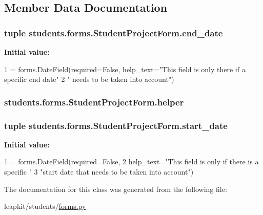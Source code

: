 \subsection{Member Data Documentation}
\hypertarget{classstudents_1_1forms_1_1_student_project_form_a14f811fbf8eae30cb9d0b2fd12adcf6b}{
\subsubsection[{end\-\_\-date}]{\setlength{\rightskip}{0pt plus 5cm}tuple students.\-forms.\-Student\-Project\-Form.\-end\-\_\-date\hspace{0.3cm}{\ttfamily [static]}}}\label{classstudents_1_1forms_1_1_student_project_form_a14f811fbf8eae30cb9d0b2fd12adcf6b}
{\bfseries Initial value\-:}
\begin{DoxyCode}
1 = forms.DateField(required=\textcolor{keyword}{False}, help\_text=\textcolor{stringliteral}{"This field is only there if a specific end date"}
2                                                          \textcolor{stringliteral}{" needs to be taken into account"})
\end{DoxyCode}
\hypertarget{classstudents_1_1forms_1_1_student_project_form_adc6a7a4cceaee86d2cf8370f4993ae99}{
\subsubsection[{helper}]{\setlength{\rightskip}{0pt plus 5cm}students.\-forms.\-Student\-Project\-Form.\-helper}}\label{classstudents_1_1forms_1_1_student_project_form_adc6a7a4cceaee86d2cf8370f4993ae99}
\hypertarget{classstudents_1_1forms_1_1_student_project_form_a6ce0966ef190039162be945d5df7786a}{
\subsubsection[{start\-\_\-date}]{\setlength{\rightskip}{0pt plus 5cm}tuple students.\-forms.\-Student\-Project\-Form.\-start\-\_\-date\hspace{0.3cm}{\ttfamily [static]}}}\label{classstudents_1_1forms_1_1_student_project_form_a6ce0966ef190039162be945d5df7786a}
{\bfseries Initial value\-:}
\begin{DoxyCode}
1 = forms.DateField(required=\textcolor{keyword}{False},
2                                  help\_text=\textcolor{stringliteral}{"This field is only if there is a specific "}
3                                            \textcolor{stringliteral}{"start date that needs to be taken into account"})
\end{DoxyCode}


The documentation for this class was generated from the following file\-:\begin{DoxyCompactItemize}
\item 
leapkit/students/\hyperlink{forms_8py}{forms.\-py}\end{DoxyCompactItemize}
